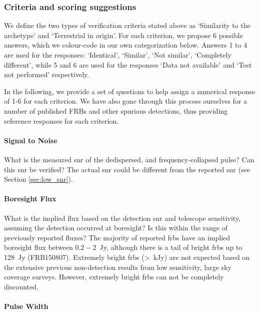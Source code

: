 \documentclass[a4paper,fleqn,usenatbib]{mnras}
\begin{document}
\subsubsection{Criteria and scoring suggestions}

We define the two types of verification criteria stated above as `Similarity to
the archetype' and `Terrestrial in origin'. For each criterion, we propose 6
possible answers, which we colour-code in our own categorization below. Answers
1 to 4 are used for the responses: `Identical', `Similar', `Not similar',
`Completely different', while 5 and 6 are used for the responses `Data not
available' and `Test not performed' respectively.

In the following, we provide a set of questions to help assign a numerical
response of 1-6 for each criterion. We have also gone through this process
ourselves for a number of published FRBs and other spurious detections, thus
providing reference responses for each criterion.  

\paragraph{Signal to Noise}

What is the measured \gls{snr} of the dedispersed, and frequency-collapsed
pulse? Can this \gls{snr} be verified? The actual \gls{snr} could be different
from the reported \gls{snr} (see Section \ref{sec:low_snr}).


\paragraph{Boresight Flux}

What is the implied flux based on the detection \gls{snr} and telescope
sensitivity, assuming the detection occurred at boresight? Is this within the
range of previously reported fluxes? The majority of reported \glspl{frb} have
an implied boresight flux between $0.2-2$~Jy, although there is a tail of bright
\glspl{frb} up to 128~Jy (FRB150807). Extremely bright \glspl{frb} (>~kJy) are
not expected based on the extensive previous non-detection results from low
sensitivity, large sky coverage surveys. However, extremely bright \glspl{frb}
can not be completely discounted.

\paragraph{Pulse Width}
\end{document}
